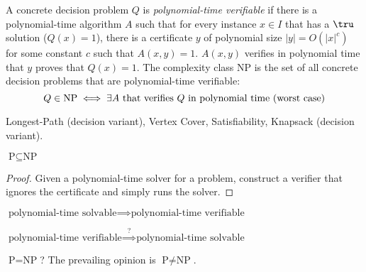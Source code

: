 \begin{definition}[Class NP]
A concrete decision problem $Q$ is \emph{polynomial-time verifiable} if there is a polynomial-time algorithm $A$ such that for every instance $x \in I$ that has a $\tru$ solution ($Q(x)=1$), there is a certificate $y$ of polynomial size $|y| = O(|x|^c)$ for some constant $c$ such that $A(x,y)=1$.
$A(x,y)$ verifies in  polynomial time that $y$ proves that $Q(x)=1$.
The  complexity class NP is the set of all concrete decision problems that are polynomial-time verifiable:
\[
Q\in\text{NP} \iff \exists \text{$A$ that verifies $Q$ in polynomial time (worst case)} \qedhere
\]
\end{definition}
\begin{example}
Longest-Path (decision variant), Vertex Cover, Satisfiability, Knapsack (decision variant).
\end{example}


\begin{theorem}\label{thm:PsubsetNP}
$\text{P}\subseteq\text{NP}$
\end{theorem}
\begin{proof}
Given a polynomial-time solver for a problem, construct a verifier that ignores the certificate and simply runs the solver.
\end{proof}

$\text{polynomial-time solvable} \implies \text{polynomial-time verifiable}$

$\text{polynomial-time verifiable} \overset{\text{?}}{\implies} \text{polynomial-time solvable}$

\begin{conjecture}[P vs. NP]\label{conj:PvNP}
$\text{P}=\text{NP}$? The prevailing opinion is $\text{P}\neq\text{NP}$.
\end{conjecture}


